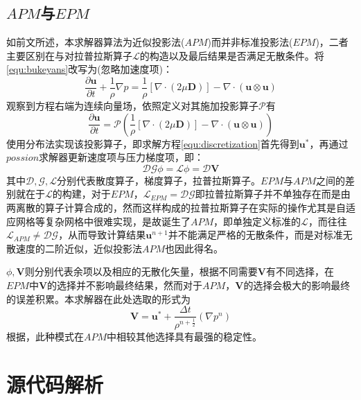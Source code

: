 \documentclass[lang=cn,11pt,a4paper]{elegantpaper}
\begin{document}
\subsection{$APM$与$EPM$}
如前文所述，本求解器算法为近似投影法($APM$)而并非标准投影法($EPM$)，二者主要区别在与对拉普拉斯算子$\mathscr{L}$的构造以及最后结果是否满足无散条件。将\ref{equ:bukeyans}改写为(忽略加速度项)：
\begin{equation}
    \frac{\partial \mathbf{u}}{\partial t}+\frac{1}{\rho}\nabla p= \frac{1}{\rho}[\nabla\cdot(2\mu\mathbf{D})]-\nabla\cdot(\mathbf{u}\otimes\mathbf{u})
\end{equation}
观察到方程右端为连续向量场，依照定义对其施加投影算子$\mathscr{P}$有
\begin{equation}
    \frac{\partial \mathbf{u}}{\partial t}=\mathscr{P} (\frac{1}{\rho}[\nabla\cdot(2\mu\mathbf{D})]-\nabla\cdot(\mathbf{u}\otimes\mathbf{u}))
\end{equation}
使用分布法实现该投影算子，即求解方程\ref{equ:discretization}首先得到$\mathbf{u}^*$，再通过$possion$求解器更新速度项与压力梯度项，即：
\begin{equation}\label{equ:renew}
    \mathscr{D}\mathscr{G}\phi =\mathscr{L} \phi= \mathscr{D}\mathbf{V}
\end{equation}
其中$\mathscr{D},\mathscr{G},\mathscr{L}$分别代表散度算子，梯度算子，拉普拉斯算子。$EPM$与$APM$之间的差别就在于$\mathscr{L}$的构建，对于$EPM$，$\mathscr{L}_{EPM}= \mathscr{D} \mathscr{G}$即拉普拉斯算子并不单独存在而是由两离散的算子计算合成的，然而这样构成的拉普拉斯算子在实际的操作尤其是自适应网格等复杂网格中很难实现，是故诞生了$APM$，即单独定义标准的$\mathscr{L}$，而往往$\mathscr{L}_{APM}\neq \mathscr{D} \mathscr{G}$，从而导致计算结果$ \mathbf{u}^{n+1}$并不能满足严格的无散条件，而是对标准无散速度的二阶近似，近似投影法$APM$也因此得名。\par
$\phi, \mathbf{V}$则分别代表余项以及相应的无散化矢量，根据不同需要$ \mathbf{V}$有不同选择\cite{almgren2000approximate}，在$EPM$中$ \mathbf{V}$的选择并不影响最终结果，然而对于$APM$，$ \mathbf{V}$的选择会极大的影响最终的误差积累。本求解器在此处选取的形式为
\begin{equation}
    \mathbf{V} = \mathbf{u}^* + \frac{\Delta t}{\rho^{n + \frac{1}{2}}}(\nabla p^n) 
\end{equation}
根据\cite{almgren2000approximate}，此种模式在$APM$中相较其他选择具有最强的稳定性。
\section{源代码解析}
\end{document}
